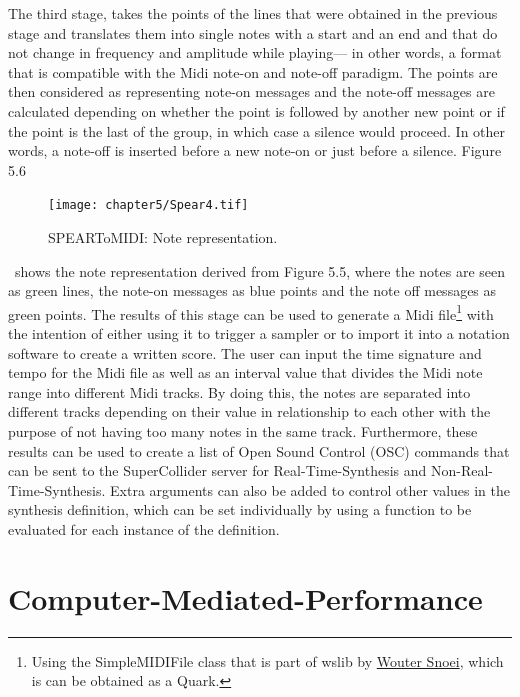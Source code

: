 The third stage, takes the points of the lines that were obtained in the previous stage and translates them into single notes with a start and an end and that do not change in frequency and amplitude while playing--- in other words, a format that is compatible with the Midi note-on and note-off paradigm. The points are then considered as representing note-on messages and the note-off messages are calculated depending on whether the point is followed by another new point or if the point is the last of the group, in which case a silence would proceed. In other words, a note-off is inserted before a new note-on or just before a silence. Figure 5.6 
\begin{figure}[htbp] %
   \centering
   \texttt{[image: chapter5/Spear4.tif]} %
   \caption{SPEARToMIDI: Note representation.}
   \label{fig:example}
\end{figure}\
shows the note representation derived from Figure 5.5, where the notes are seen as green lines, the note-on messages as blue points and the note off messages as green points.\hypertarget{wlib}{} The results of this stage can be used to generate a Midi file\footnote{Using the SimpleMIDIFile class that is part of wslib by \href{http://www.woutersnoei.nl/}{Wouter Snoei}, which is can be obtained as a Quark.} with the intention of either using it to trigger a sampler or to import it into a notation software to create a written score. The user can input the time signature and tempo for the Midi file as well as an interval value that divides the Midi note range into different Midi tracks. By doing this, the notes are separated into different tracks depending on their value in relationship to each other with the purpose of not having too many notes in the same track. Furthermore, these results can be used to create a list of Open Sound Control (OSC) commands that can be sent to the SuperCollider server for Real-Time-Synthesis and Non-Real-Time-Synthesis. Extra arguments can also be added to control other values in the synthesis definition, which can be set individually by using a function to be evaluated for each instance of the definition.

\section{Computer-Mediated-Performance}

